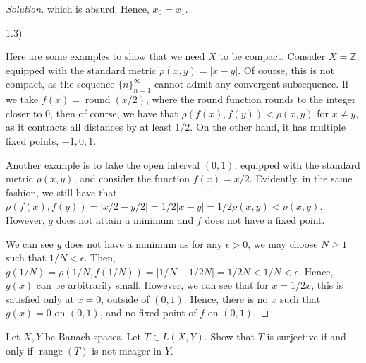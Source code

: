 \documentclass[10pt]{article}
\newenvironment{problem}[2][]{\begin{trivlist}
\item[\hskip \labelsep {\bfseries #1}\hskip \labelsep {\bfseries #2.}]}{\end{trivlist}}
\begin{document}
\begin{proof}[Solution]
which is absurd. Hence, $x_0 = x_1$. 

1.3)

Here are some examples to show that we need $X$ to be compact. Consider $X = \mathbb{Z}$, equipped with the standard metric $\rho(x,y) = | x - y | $. Of course, this is not compact, as the sequence $\{ n \}_{n=1}^\infty$ cannot admit any convergent subsequence. If we take $f(x) = \operatorname{round}(x/2)$, where the round function rounds to the integer closer to $0$, then of course, we have that $\rho(f(x), f(y)) < \rho(x,y)$ for $x \not = y$, as it contracts all distances by at least 1/2. On the other hand, it has multiple fixed points, $-1, 0, 1$.

Another example is to take the open interval $(0,1)$, equipped with the standard metric $\rho(x,y)$, and consider the function $f(x) = x/2$. Evidently, in the same fashion, we still have that $\rho(f(x), f(y)) = | x/2 - y/2 | = 1/2 | x- y | = 1/2 \rho(x,y) < \rho(x,y)$. However, $g$ does not attain a minimum and $f$ does not have a fixed point.

We can see $g$ does not have a minimum as for any $\epsilon > 0$, we may choose $N \geq 1$ such that $1/N < \epsilon$. Then, $g(1/N) = \rho(1/N, f(1/N)) = | 1/N - 1/2N | = 1/2N < 1/N < \epsilon$. Hence, $g(x)$ can be arbitrarily small. However, we can see that for $x = 1/2x$, this is satisfied only at $x = 0$, outside of $(0,1)$. Hence, there is no $x$ such that $g(x) = 0$ on $(0,1)$, and no fixed point of $f$ on $(0,1)$.

\end{proof}
\pagebreak
\begin{problem}{Question 2}

Let $X, Y$ be Banach spaces. Let $T \in L(X,Y)$. Show that $T$ is surjective if and only if $\operatorname{range}(T)$ is not meager in $Y$.

\end{problem}
\end{document}
